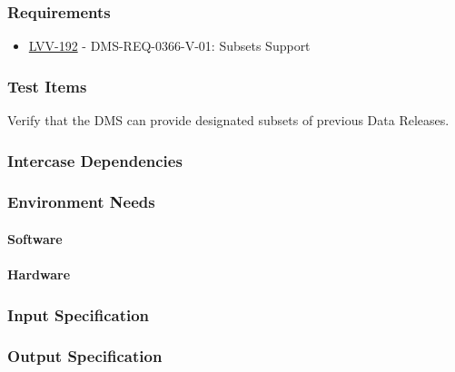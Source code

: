 \subsubsection{Requirements}
\begin{itemize}
\item \href{https://jira.lsstcorp.org/browse/LVV-192}{LVV-192} - DMS-REQ-0366-V-01: Subsets Support
\end{itemize}

\subsubsection{Test Items}
Verify that the DMS can provide designated subsets of previous Data
Releases.



\subsubsection{Intercase Dependencies}

\subsubsection{Environment Needs}

\paragraph{Software}

\paragraph{Hardware}

\subsubsection{Input Specification}

\subsubsection{Output Specification}

